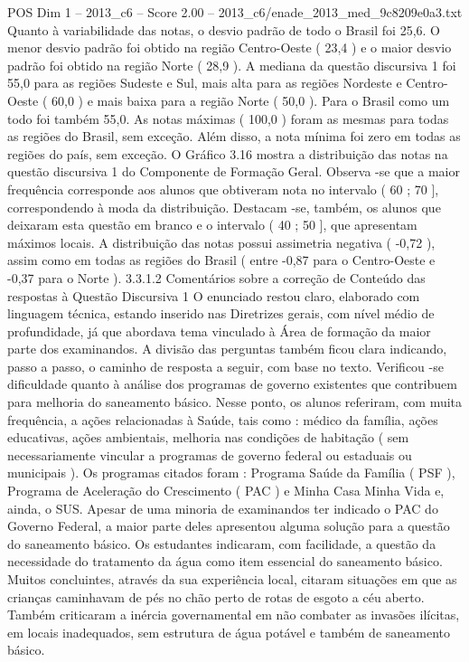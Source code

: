 \begin{textsample}{POS Dim 1 – 2013\_c6 – Score 2.00 – 2013\_c6/enade\_2013\_med\_9c8209e0a3.txt}
Quanto à variabilidade das notas, o desvio padrão de todo o Brasil foi 25,6.
O menor desvio padrão foi obtido na região Centro-Oeste ( 23,4 ) e o maior desvio padrão foi obtido na região Norte ( 28,9 ).
A mediana da questão discursiva 1 foi 55,0 para as regiões Sudeste e Sul, mais alta para as regiões Nordeste e Centro-Oeste ( 60,0 ) e mais baixa para a região Norte ( 50,0 ).
Para o Brasil como um todo foi também 55,0.
As notas máximas ( 100,0 ) foram as mesmas para todas as regiões do Brasil, sem exceção.
Além disso, a nota mínima foi zero em todas as regiões do país, sem exceção.
O Gráfico 3.16 mostra a distribuição das notas na questão discursiva 1 do Componente de Formação Geral.
Observa -se que a maior frequência corresponde aos alunos que obtiveram nota no intervalo ( 60 ; 70 ], correspondendo à moda da distribuição.
Destacam -se, também, os alunos que deixaram esta questão em branco e o intervalo ( 40 ; 50 ], que apresentam máximos locais.
A distribuição das notas possui assimetria negativa ( -0,72 ), assim como em todas as regiões do Brasil ( entre -0,87 para o Centro-Oeste e -0,37 para o Norte ). 3.3.1.2 Comentários sobre a correção de Conteúdo das respostas à Questão Discursiva 1 O enunciado restou claro, elaborado com linguagem técnica, estando inserido nas Diretrizes gerais, com nível médio de profundidade, já que abordava tema vinculado à Área de formação da maior parte dos examinandos.
A divisão das perguntas também ficou clara indicando, passo a passo, o caminho de resposta a seguir, com base no texto.
Verificou -se dificuldade quanto à análise dos programas de governo existentes que contribuem para melhoria do saneamento básico.
Nesse ponto, os alunos referiram, com muita frequência, a ações relacionadas à Saúde, tais como : médico da família, ações educativas, ações ambientais, melhoria nas condições de habitação ( sem necessariamente vincular a programas de governo federal ou estaduais ou municipais ).
Os programas citados foram : Programa Saúde da Família ( PSF ), Programa de Aceleração do Crescimento ( PAC ) e Minha Casa Minha Vida e, ainda, o SUS.
Apesar de uma minoria de examinandos ter indicado o PAC do Governo Federal, a maior parte deles apresentou alguma solução para a questão do saneamento básico.
Os estudantes indicaram, com facilidade, a questão da necessidade do tratamento da água como item essencial do saneamento básico.
Muitos concluintes, através da sua experiência local, citaram situações em que as crianças caminhavam de pés no chão perto de rotas de esgoto a céu aberto.
Também criticaram a inércia governamental em não combater as invasões ilícitas, em locais inadequados, sem estrutura de água potável e também de saneamento básico.

\end{textsample}
